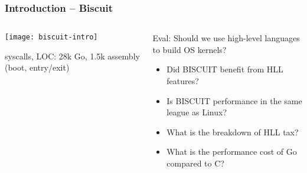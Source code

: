 \begin{frame}[plain]
	\frametitle{Introduction -- Biscuit}
	
	\begin{columns}
		
		\begin{column}{.4\textwidth}
			
			\texttt{[image: biscuit-intro]}
			
			 syscalls, LOC: 28k Go,
			1.5k assembly (boot, entry/exit)
			
		\end{column}
		
		\begin{column}{.6\textwidth}
		Eval: Should we use high-level languages to build OS kernels?
			\begin{itemize}
				\item Did BISCUIT benefit from HLL features?
				
				\item  Is BISCUIT performance in the same league as Linux?
				
				\item What is the breakdown of HLL tax?
				
				\item  What is the performance cost of Go compared to C?
				
				
			\end{itemize}
			
			
		\end{column}
	\end{columns}	
\end{frame}


